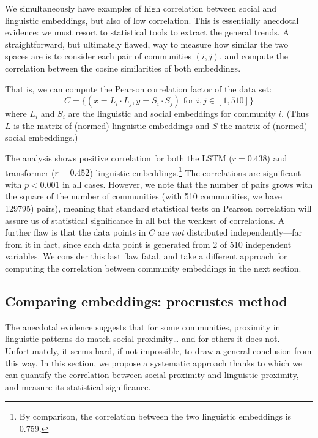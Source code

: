 \documentclass[11pt]{article}
\begin{document}
We simultaneously have examples of high correlation between social and
linguistic embeddings, but also of low correlation. This is
essentially anecdotal evidence: we must resort to statistical tools to
extract the general trends.
A straightforward, but ultimately flawed,
way to measure how similar the two spaces are is to consider each pair
of communities \((i,j)\), and compute the correlation between the
cosine similarities of both embeddings.

That is, we can compute the Pearson correlation factor of the data set:
\[C = \{(x = L_i · L_j, y = S_i · S_j) \text {~for~} i,j ∈
  [1,510]\}\] %
where \(L_i\) and \(S_i\) are the linguistic and social embeddings for
community \(i\).  (Thus \(L\) is the matrix of (normed) linguistic
embeddings and \(S\) the matrix of (normed) social embeddings.)

The analysis shows positive correlation for both the LSTM ($r=0.438$)
and transformer ($r=0.452$) linguistic embeddings.\footnote{ By
  comparison, the correlation between the two linguistic embeddings is
  \num{0.759}.}  The correlations are significant with $p<0.001$ in
all cases.  However, we note that the number of pairs grows with the
square of the number of communities (with 510 communities, we have
129795) pairs), meaning that standard statistical tests on Pearson
correlation will assure us of statistical significance in all but the
weakest of correlations. A further flaw is that the data points in
\(C\) are \emph{not} distributed independently---far from it in fact,
since each data point is generated from \num{2} of \num{510}
independent variables. We consider this last flaw fatal, and take a
different approach for computing the correlation between community
embeddings in the next section.


\subsection{Comparing embeddings: procrustes method}
\label{sec:statistical-evidence}



The anecdotal evidence suggests that for some communities, proximity
in linguistic patterns do match social proximity… and for others it
does not. Unfortunately, it seems hard, if not impossible, to draw a
general conclusion from this way. In this section, we propose a
systematic approach thanks to which we can quantify the correlation
between social proximity and linguistic proximity, and measure its
statistical significance.
\end{document}

